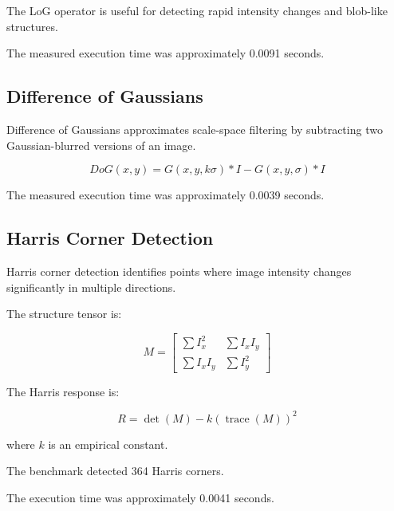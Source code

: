 \documentclass[11pt,a4paper]{article}
\begin{document}
The LoG operator is useful for detecting rapid intensity changes and blob-like structures.

The measured execution time was approximately 0.0091 seconds.


\subsection{Difference of Gaussians}

Difference of Gaussians approximates scale-space filtering by subtracting two Gaussian-blurred versions of an image.

\begin{equation}
DoG(x,y)=
G(x,y,k\sigma)*I-
G(x,y,\sigma)*I
\end{equation}

The measured execution time was approximately 0.0039 seconds.


\subsection{Harris Corner Detection}

Harris corner detection identifies points where image intensity changes significantly in multiple directions.

The structure tensor is:

\begin{equation}
M=
\begin{bmatrix}
\sum I_x^2 & \sum I_xI_y\\
\sum I_xI_y & \sum I_y^2
\end{bmatrix}
\end{equation}

The Harris response is:

\begin{equation}
R=\det(M)-k(\operatorname{trace}(M))^2
\end{equation}

where $k$ is an empirical constant.

The benchmark detected 364 Harris corners.

The execution time was approximately 0.0041 seconds.

\end{document}
